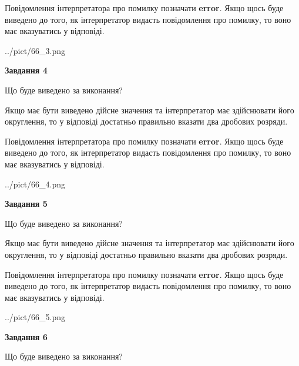 \documentclass[12pt, ukrainian]{article}
\begin{document}
{\begin {Large}
Повідомлення інтерпретатора про помилку позначати \textbf{error}.
Якщо щось буде виведено до того, як інтерпретатор видасть повідомлення про помилку, 
то воно має вказуватись у відповіді. \par

\begin{center}
	{../pict/66_3.png}
\end{center}
\newpage

{\begin {center}\textbf{Завдання 4}\end {center}}\par
Що буде виведено за виконання? \par

Якщо має бути виведено дійсне значення та інтерпретатор має здійснювати його округлення, 
то у відповіді достатньо правильно вказати два дробових розряди.

Повідомлення інтерпретатора про помилку позначати \textbf{error}.
Якщо щось буде виведено до того, як інтерпретатор видасть повідомлення про помилку, 
то воно має вказуватись у відповіді. \par

\begin{center}
	{../pict/66_4.png}
\end{center}
\newpage

{\begin {center}\textbf{Завдання 5}\end {center}}\par
Що буде виведено за виконання? \par

Якщо має бути виведено дійсне значення та інтерпретатор має здійснювати його округлення, 
то у відповіді достатньо правильно вказати два дробових розряди.

Повідомлення інтерпретатора про помилку позначати \textbf{error}.
Якщо щось буде виведено до того, як інтерпретатор видасть повідомлення про помилку, 
то воно має вказуватись у відповіді. \par

\begin{center}
	{../pict/66_5.png}
\end{center}
\newpage

{\begin {center}\textbf{Завдання 6}\end {center}}\par
Що буде виведено за виконання? \par


\end{Large}}
\end{document}
